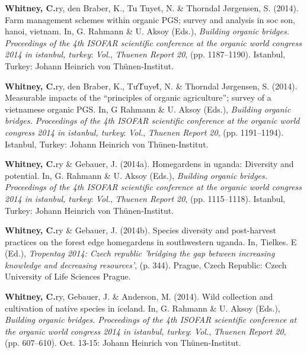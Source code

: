 \documentclass[11pt,a4paper,]{awesome-cv}
\newlength{\cslhangindent}
\newenvironment{CSLReferences}[2] %
 {\begin{list}{}{%
  \setlength{\itemindent}{0pt}
  \setlength{\leftmargin}{0pt}
  \setlength{\parsep}{0pt}
  \ifodd #1
   \setlength{\leftmargin}{\cslhangindent}
   \setlength{\itemindent}{-1\cslhangindent}
  \fi
  \setlength{\itemsep}{#2\baselineskip}}}
 {\end{list}}
\begin{document}
\begin{CSLReferences}{1}{0}
\textbf{Whitney, C.}ry, den Braber, K., Tu Tuyet, N. \& Thorndal
Jørgensen, S. (2014). Farm management schemes within organic PGS; survey
and analysis in soc son, hanoi, vietnam. In, G. Rahmann \& U. Aksoy
(Eds.), \emph{Building organic bridges. Proceedings of the 4th ISOFAR
scientific conference at the organic world congress 2014 in istanbul,
turkey}: \emph{Vol.}, \emph{Thuenen Report 20}, (pp. 1187--1190).
Istanbul, Turkey: Johann Heinrich von Thünen-Institut.

\textbf{Whitney, C.}ry, den Braber, K., TưT̀uyet̂́, N. \& Thorndal
Jørgensen, S. (2014). Measurable impacts of the {``principles of organic
agriculture''}; survey of a vietnamese organic PGS. In, G Rahmann \& U.
Aksoy (Eds.), \emph{Building organic bridges. Proceedings of the 4th
ISOFAR scientific conference at the organic world congress 2014 in
istanbul, turkey}: \emph{Vol.}, \emph{Thuenen Report 20}, (pp.
1191--1194). Istanbul, Turkey: Johann Heinrich von Thünen-Institut.

\textbf{Whitney, C.}ry \& Gebauer, J. (2014a). Homegardens in uganda:
Diversity and potential. In, G. Rahmann \& U. Aksoy (Eds.),
\emph{Building organic bridges. Proceedings of the 4th ISOFAR scientific
conference at the organic world congress 2014 in istanbul, turkey}:
\emph{Vol.}, \emph{Thuenen Report 20}, (pp. 1115--1118). Istanbul,
Turkey: Johann Heinrich von Thünen-Institut.

\textbf{Whitney, C.}ry \& Gebauer, J. (2014b). Species diversity and
post-harvest practices on the forest edge homegardens in southwestern
uganda. In, Tielkes. E (Ed.), \emph{Tropentag 2014: Czech republic
'bridging the gap between increasing knowledge and decreasing
resources'}, (p. 344). Prague, Czech Republic: Czech University of Life
Sciences Prague.

\textbf{Whitney, C.}ry, Gebauer, J. \& Anderson, M. (2014). Wild
collection and cultivation of native species in iceland. In, G. Rahmann
\& U. Aksoy (Eds.), \emph{Building organic bridges. Proceedings of the
4th ISOFAR scientific conference at the organic world congress 2014 in
istanbul, turkey}: \emph{Vol.}, \emph{Thuenen Report 20}, (pp.
607--610). Oct. 13-15: Johann Heinrich von Thünen-Institut.


\end{CSLReferences}
\end{document}
